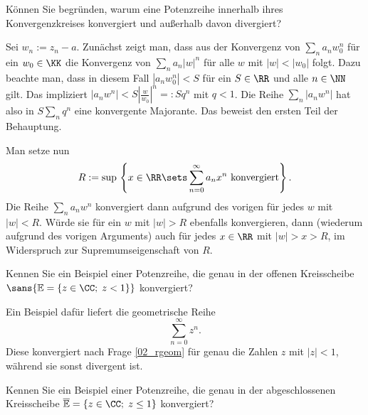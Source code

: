 \begin{frage}
  Können Sie begründen, 
  warum eine Potenzreihe innerhalb ihres Konvergenzkreises 
  konvergiert und außerhalb davon divergiert?
\end{frage}

\begin{antwort}
  Sei $w_n := z_n-a$. Zunächst zeigt man, dass 
  aus der Konvergenz von $\sum_n a_n w_0^n$ für ein $w_0\in\KK$ 
  die Konvergenz von $\sum_n a_n |w|^n$ für alle $w$ mit $|w|<|w_0|$ folgt. 
  Dazu beachte man, dass in diesem Fall $|a_n w_0^n| < S$ für ein $S\in\RR$ 
  und alle $n\in\NN$ gilt. Das impliziert 
  $|a_n w^n| < S \left|\frac{w}{w_0}\right|^n = : Sq^n$ mit $q<1$. Die Reihe 
  $\sum_n |a_n w^n|$ hat also in $S \sum_n q^n$ eine konvergente Majorante. Das 
  beweist den ersten Teil der Behauptung.

  Man setze nun 
  \[
  R := \sup\, \left\{ x\in\RR\sets 
    \sum_{n=0}^\infty a_n x^n \text{ konvergiert}\right\}.
  \]
  Die Reihe $\sum_n  a_n w^n$
  konvergiert dann aufgrund des vorigen für jedes $w$ mit 
  $|w| < R$. Würde sie für ein $w$ mit $|w|>R$ ebenfalls 
  konvergieren, dann (wiederum aufgrund des 
  vorigen Arguments) auch für jedes $x \in \RR$ mit 
  $|w|>x>R$, im Widerspruch zur Supremumseigenschaft 
  von $R$.
  \AntEnd
\end{antwort}

\begin{frage}\label{02_prbsp}
  Kennen Sie ein Beispiel einer Potenzreihe, die genau in der 
  offenen Kreisscheibe 
  $\sans{\mathbb{E} = \{ z\in\CC;\; z <1 \}}$ konvergiert?
\end{frage}

\begin{antwort}
  Ein Beispiel dafür liefert die geometrische Reihe 
  \[
  \sum_{n=0}^\infty z^n.
  \]
  Diese konvergiert nach Frage \ref{02_rgeom} für genau die 
  Zahlen $z$ mit $|z| < 1$, während sie sonst divergent ist.
  \AntEnd
\end{antwort}

\begin{frage}\label{02_prbspa}
  Kennen Sie ein Beispiel einer Potenzreihe, die genau in der 
  abgeschlossenen Kreisscheibe 
  $\overline{\mathbb{E}} = \{ z\in\CC;\; z  \le 1 \}$ 
  konvergiert?
\end{frage}



